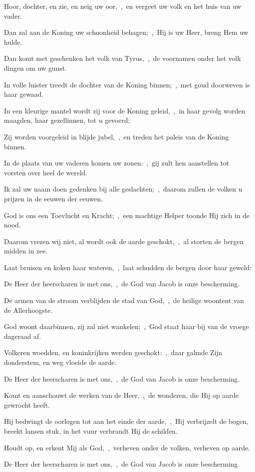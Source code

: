 \documentclass[12pt,twoside,a5paper]{article}
\begin{document}
\begin{halfparskip}
  Hoor, dochter, en zie, en neig uw oor,~\sep\ en vergeet uw volk en het huis van uw vader.

  Dan zal aan de Koning uw schoonheid behagen;~\sep\ Hij is uw Heer, breng Hem uw hulde.

  Dan komt met geschenken het volk van Tyrus,~\sep\ de voornamen onder het volk dingen om uw gunst.

  In volle luister treedt de dochter van de Koning binnen;~\sep\ met goud doorweven is haar gewaad.

  In een kleurige mantel wordt zij voor de Koning geleid,~\sep\ in haar gevolg worden maagden, haar
  gezellinnen, tot u gevoerd;

  Zij worden voorgeleid in blijde jubel,~\sep\ en treden het paleis van de Koning binnen.

  In de plaats van uw vaderen komen uw zonen:~\sep\ gij zult hen aanstellen tot vorsten over heel de wereld.

  Ik zal uw naam doen gedenken bij alle geslachten;~\sep\ daarom zullen de volken u prijzen in de eeuwen der eeuwen.

   God is ons een Toevlucht en Kracht;~\sep\ een machtige Helper toonde Hij zich in de nood.

  Daarom vrezen wij niet, al wordt ook de aarde geschokt,~\sep\ al storten de bergen midden in zee.

  Laat bruisen en koken haar wateren,~\sep\ laat schudden de bergen door haar geweld:

  De Heer der heerscharen is met ons,~\sep\ de God van Jacob is onze bescherming.

  De armen van de stroom verblijden de stad van God,~\sep\ de heilige woontent van de Allerhoogste.

  God woont daarbinnen, zij zal niet wankelen;~\sep\ God staat haar bij van de vroege dageraad af.

  Volkeren woedden, en koninkrijken werden geschokt:~\sep\ daar galmde Zijn donderstem, en weg vloeide de aarde.

  De Heer der heerscharen is met ons,~\sep\ de God van Jacob is onze bescherming.

  Komt en aanschouwt de werken van de Heer,~\sep\ de wonderen, die Hij op aarde gewrocht heeft.

  Hij bedwingt de oorlogen tot aan het einde der aarde,~\sep\ Hij verbrijzelt de bogen, breekt lansen stuk, in het vuur verbrandt Hij de schilden.

  Houdt op, en erkent Mij als God,~\sep\ verheven onder de volken, verheven op aarde.

  De Heer der heerscharen is met ons,~\sep\ de God van Jacob is onze bescherming.
\end{halfparskip}
\end{document}
